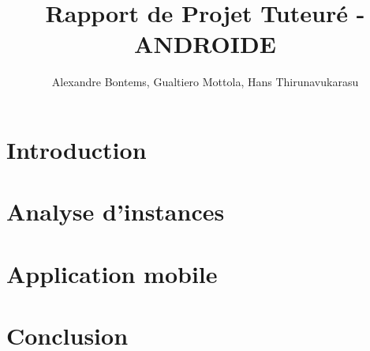 \documentclass[a4paper, 11pt, titlepage]{article}
\title{Rapport de Projet Tuteuré - ANDROIDE}
\author{Alexandre Bontems, Gualtiero Mottola, Hans Thirunavukarasu}
\begin{document}
	
	\maketitle
	\tableofcontents
	\newpage

	\section{Introduction}
		
	\section{Analyse d'instances}
        
	\section{Application mobile}
	    
	\section{Conclusion}
	
    \printbibliography[heading=bibintoc]
%	
\end{document}
